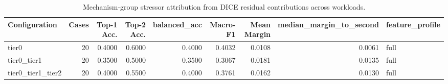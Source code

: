 \begin{table}[t]
\centering
\caption{Mechanism-group stressor attribution from DICE residual contributions across workloads.}
\label{tab:dice_stressor_diagnosis}
\footnotesize
\begin{tabular}{lrrrrrrrl}
\toprule
Configuration & Cases & Top-1 Acc. & Top-2 Acc. & balanced_acc & Macro-F1 & Mean Margin & median_margin_to_second & feature_profile \\
\midrule
tier0 & 20 & 0.4000 & 0.6000 & 0.4000 & 0.4032 & 0.0108 & 0.0061 & full \\
tier0_tier1 & 20 & 0.3500 & 0.5000 & 0.3500 & 0.3067 & 0.0181 & 0.0135 & full \\
tier0_tier1_tier2 & 20 & 0.4000 & 0.5500 & 0.4000 & 0.3761 & 0.0162 & 0.0130 & full \\
\bottomrule
\end{tabular}

\end{table}
